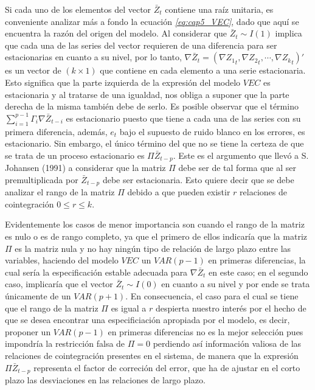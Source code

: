 Si cada uno de los elementos del vector $\bar{Z}_t$ contiene una raíz unitaria, es conveniente analizar más a fondo la ecuación \textit{\ref{eq:cap5_VEC}}, dado que aquí se encuentra la razón del origen del modelo. Al considerar que $\bar{Z}_t\sim I(1)$ implica que cada una de las series del vector requieren de una diferencia para ser estacionarias en cuanto a su nivel, por lo tanto, $\nabla \bar{Z}_t = \left (  \nabla {Z_1}_t, \nabla {Z_2}_t, \cdots, \nabla {Z_k}_t\right )'$  es un vector de $(k \times 1)$ que contiene en cada elemento a una serie estacionaria.  Esto significa que la parte izquierda de la expresión del modelo $VEC$ es estacionaria y al tratarse de una igualdad, nos obliga a suponer que la parte derecha de la misma también debe de serlo.  Es posible observar que el término $\sum_{i=1}^{p-1}\Gamma_i\nabla\bar{Z}_{t-i} $ es estacionario puesto que tiene a cada una de las series con su primera diferencia, además, $e_t$ bajo el supuesto de ruido blanco en los errores, es estacionario. Sin embargo,  el único término del que no se tiene la certeza de que se trata de un proceso estacionario es $\Pi\bar{Z}_{t-p}$. Este es el argumento que llevó a S. Johansen (1991) a considerar que la matriz $\Pi$ debe ser de tal forma que al ser premultiplicada por $\bar{Z}_{t-p}$ debe ser estacionaria. Esto quiere decir que se debe analizar el rango de la matriz $\Pi$ debido a que pueden existir $r$ relaciones de cointegración $0\leq r \leq k$.\bigskip 

 Evidentemente los casos de menor importancia son cuando el rango de la matriz es nulo o es de rango completo, ya que el primero de ellos indicaría que la matriz $\Pi$ es la matriz nula y no hay ningún tipo de relación de largo plazo entre las variables, haciendo del modelo $VEC$ un $VAR(p-1)$ en primeras diferencias, la cual sería la especificación estable adecuada para $\nabla \bar{Z}_t$ en este caso; en el segundo caso, implicaría que el vector $\bar{Z}_t\sim I(0)$ en cuanto a su nivel y por ende  se trata únicamente de un $VAR(p+1)$. En consecuencia, el caso para el cual se tiene que el rango de la matriz $\Pi$ es igual a $r$ despierta nuestro interés por el hecho de que se desea encontrar una especificiación apropiada por el modelo, es decir, proponer un   $VAR(p-1)$  en primeras diferencias no es la mejor selección pues impondría la restricción falsa de $\Pi=0$ perdiendo así información valiosa de las relaciones de cointegración presentes en el sistema, de manera que la expresión $\Pi\bar{Z}_{t-p}$ representa el factor de correción del error, que ha de ajustar en el corto plazo las desviaciones en las relaciones de largo plazo.\bigskip 
 
